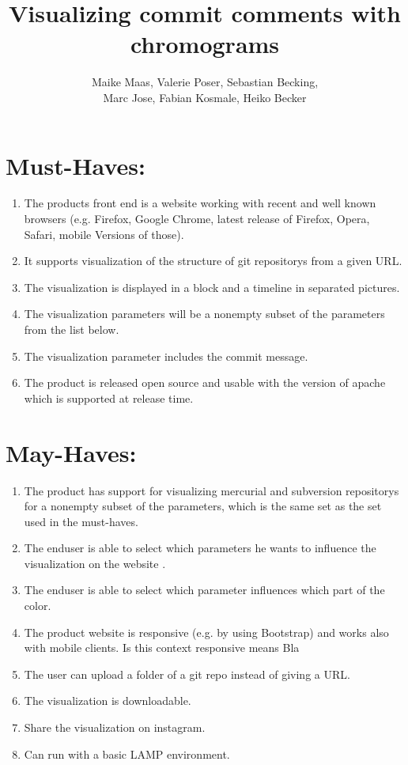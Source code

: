 \documentclass[10pt,a4paper]{article}
\author{Maike Maas, Valerie Poser, Sebastian Becking,\\
Marc Jose, Fabian Kosmale, Heiko Becker}
\title{Visualizing commit comments with chromograms}
\begin{document}
\maketitle
\renewcommand{\baselinestretch}{1.50}\normalsize
\section{Must-Haves:}
\begin{enumerate}
\item The products front end is a website working with recent and well known browsers (e.g. Firefox, Google Chrome, latest release of Firefox, Opera, Safari, mobile Versions of those).
\item It supports visualization of the structure of git repositorys from a given URL.
\item The visualization is displayed in a block and a timeline in separated pictures.
\item The visualization parameters will be a nonempty subset of the parameters from the list below.
\item The visualization parameter includes the commit message.
\item The product is released open source and usable with the version of apache which is supported at release time.
\end{enumerate}
\section{May-Haves:}
\begin{enumerate}
\item The product has support for visualizing mercurial and subversion repositorys for a nonempty subset of the parameters, which is the same set as the set used in the must-haves.
\item The enduser is able to select which parameters he wants to influence the visualization on the website .
\item The enduser is able to select which parameter influences which part of the color.
\item The product website is responsive (e.g. by using Bootstrap) and works also with mobile clients. Is this context responsive means Bla
\item The user can upload a folder of a git repo instead of giving a URL.
\item The visualization is downloadable.
\item Share the visualization on instagram.
\item Can run with a basic LAMP environment.
\end{enumerate}
\end{document}
